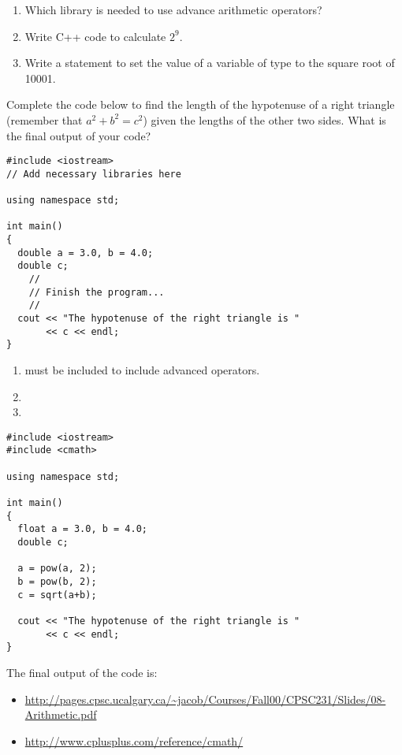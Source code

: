\begin{enumerate}
\item Which  library is needed to use advance arithmetic operators?

\item Write C++ code to calculate $2^9$.

\item Write a statement to set the value of a variable of type  to the square root of 10001.
\end{enumerate}

Complete the code below to find the length of the hypotenuse of a right triangle (remember that $a^2 + b^2 = c^2$) given the lengths of the other two sides. What is the final output of your code?

\noindent\begin{minipage}{\linewidth}\begin{lstlisting}
#include <iostream>
// Add necessary libraries here

using namespace std;

int main()
{
  double a = 3.0, b = 4.0;
  double c;
	//
	// Finish the program...
	//
  cout << "The hypotenuse of the right triangle is "
       << c << endl;
}
\end{lstlisting}\end{minipage}


\begin{enumerate}
\item {} must be included to include advanced operators.
\item {}
\item {}
\end{enumerate}


\noindent\begin{minipage}{\linewidth}\begin{lstlisting}
#include <iostream>
#include <cmath>

using namespace std;

int main()
{
  float a = 3.0, b = 4.0;
  double c;
	
  a = pow(a, 2);
  b = pow(b, 2);
  c = sqrt(a+b);

  cout << "The hypotenuse of the right triangle is "
       << c << endl;
}
\end{lstlisting}\end{minipage}

The final output of the code is: 



\begin{itemize}
\item \url{http://pages.cpsc.ucalgary.ca/~jacob/Courses/Fall00/CPSC231/Slides/08-Arithmetic.pdf}
\item \url{http://www.cplusplus.com/reference/cmath/}
\end{itemize}
